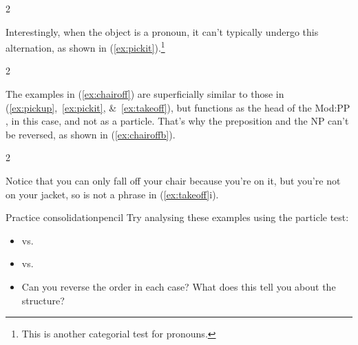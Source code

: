 \begin{multicols}{2}
\ea \label{ex:pickup}
    \ea \label{ex:pickupa}
    \z
    \ex \label{ex:pickupb}
        \z
    \z
\z
\end{multicols}
Interestingly, when the object is a pronoun, it can't typically undergo this alternation, as shown in (\ref{ex:pickit}).\footnote{This is another categorial test for pronouns.}

\begin{multicols}{2}
\ea \label{ex:pickit}
    \ea
    \z
    \ex
        \z
    \z
\z
\end{multicols}

The examples in (\ref{ex:chairoff}) are superficially similar to those in (\ref{ex:pickup},~\ref{ex:pickit}, \&~\ref{ex:takeoff}), but  functions as the head of the Mod:PP , in this case, and not as a particle. That's why the preposition and the NP can't be reversed, as shown in (\ref{ex:chairoffb}).

\begin{multicols}{2}
\ea
    \ea \label{ex:takeoff}
    \z
    \ex \label{ex:chairoff}
        \label{ex:chairoffb}
        \z
    \z
\z
\end{multicols}

Notice that you can only fall off your chair because you're on it, but you're not on your jacket, so  is not a phrase in (\ref{ex:takeoff}i).

\begin{tblsframedsymbol}{Practice consolidation}{pencil}
Try analysing these examples using the particle test:
\begin{itemize}[noitemsep, leftmargin=*]
    \item {} vs. 
    \item {} vs. 
    \item Can you reverse the order in each case? What does this tell you about the structure?
\end{itemize}
\end{tblsframedsymbol}

